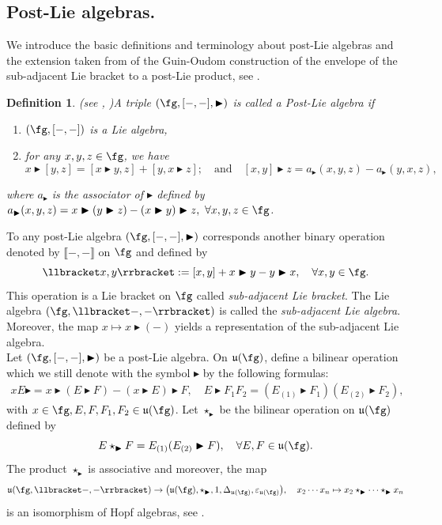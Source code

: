 \documentclass[12pt]{article}
\newcommand{\btr}{\blacktriangleright}
\newtheorem{definition}[theorem]{Definition}
\begin{document}
\subsection{Post-Lie algebras.}\label{sec:postLie} We introduce the basic definitions and terminology about post-Lie algebras and the extension taken from \cite{EFLM} of the Guin-Oudom construction of the envelope of the sub-adjacent Lie bracket to a post-Lie product, see \cite{OG}.
\begin{definition}(see \cite{Va}, \cite{MKL})\label{def:postLie}
A triple $(\fg, [-,-],\btr)$ is called a Post-Lie algebra if 
\begin{enumerate}
\item $(\fg, [-,-])$ is a Lie algebra,
\item for any $x,y,z \in \fg$, we have
$$
x \btr [y,z] = [x \btr y, z] + [y, x \btr z]; \quad \text{and} \quad  [x,y]\btr z = a_{\btr}(x,y,z) -  a_{\btr}(y,x,z),
$$
\end{enumerate}
where $a_{\btr}$ is the associator of $\btr$ defined by $a_{\btr}(x,y,z) = x\btr (y \btr z) - (x\btr y) \btr z,~\forall x,y,z\in \fg$.
\end{definition}
To any post-Lie algebra $(\fg, [-,-],\btr)$ corresponds another binary operation denoted by $\llbracket-,-\rrbracket$ on $\fg$ and defined by 
\begin{equation}\label{eq:subadjacent-bracket}
    \llbracket x,y\rrbracket:=[x,y]+x\btr y-y\btr x,\quad \forall x,y\in\fg.
\end{equation}
This operation is a Lie bracket on $\fg$ called \textit{sub-adjacent Lie bracket}. The Lie algebra $(\fg,\llbracket-,-\rrbracket)$ is called the \textit{sub-adjacent Lie algebra}. Moreover, the map $x\mapsto x\btr(-)$ yields a representation of the sub-adjacent Lie algebra.\\


Let $(\fg, [-,-],\btr)$ be a post-Lie algebra. On $\mathfrak{u}(\fg)$, define a bilinear operation which we still denote with the symbol $\btr$ by the following formulas:
\begin{align}
\label{eqn:extension}
xE \btr = x \btr(E\btr F) - (x \btr E)\btr F,\quad E \btr F_1 F_2 = (E_{(1)} \btr F_{1})(E_{(2)} \btr F_{2}),
\end{align}
with $x \in \fg, E,F,F_1,F_2 \in \mathfrak{u}(\fg)$. Let $\star_{\btr}$ be the bilinear operation on $\mathfrak{u}(\fg)$ defined by 
\begin{equation}
E \star_{\btr} F = E_{(1)} (E_{(2)}\btr F),\quad \forall E,F \in \mathfrak{u}(\fg).
\end{equation}
The product $\star_{\btr}$ is associative and moreover, the map 
\begin{equation}
\mathfrak{u}(\fg, \llbracket -,-\rrbracket) \to \bigl(\mathfrak{u}(\fg), \star_{\btr}, 1, \Delta_{\mathfrak{u}(\fg)}, \varepsilon_{\mathfrak{u}(\fg)}\bigl),\quad x_2\cdots x_n \mapsto x_2 \star_{\btr} \cdots \star_{\btr} x_n
\end{equation}
is an isomorphism of Hopf algebras, see \cite{OG,EFLM}.
\end{document}

